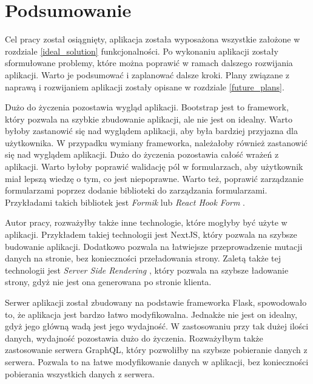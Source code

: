 \section{Podsumowanie}\label{summary}
Cel pracy został osiągnięty, aplikacja została wyposażona wszystkie założone w rozdziale \ref{ideal_solution} funkcjonalności. Po wykonaniu aplikacji zostały sformułowane problemy, które można poprawić w ramach dalszego rozwijania aplikacji. Warto je podsumować i zaplanować dalsze kroki. Plany związane z naprawą i rozwijaniem aplikacji zostały opisane w rozdziale \ref{future_plans}.

Dużo do życzenia pozostawia wygląd aplikacji. Bootstrap jest to framework, który pozwala na szybkie zbudowanie aplikacji, ale nie jest on idealny. Warto byłoby zastanowić się nad wyglądem aplikacji, aby była bardziej przyjazna dla użytkownika. W przypadku wymiany frameworka, należałoby również zastanowić się nad wyglądem aplikacji. Dużo do życzenia pozostawia całość wrażeń z aplikacji. Warto byłoby poprawić walidację pól w formularzach, aby użytkownik miał lepszą wiedzę o tym, co jest niepoprawne. Warto też, poprawić zarządzanie formularzami poprzez dodanie biblioteki do zarządzania formularzami. Przykładami takich bibliotek jest \textit{Formik} \cite{Formik} lub \textit{React Hook Form} \cite{React_hook_form}.

Autor pracy, rozważyłby także inne technologie, które mogłyby być użyte w aplikacji. Przykładem takiej technologii jest NextJS, który pozwala na szybsze budowanie aplikacji. Dodatkowo pozwala na łatwiejsze przeprowadzenie mutacji danych na stronie, bez konieczności przeładowania strony. Zaletą także tej technologii jest \textit{Server Side Rendering} \cite{SSR}, który pozwala na szybsze ładowanie strony, gdyż nie jest ona generowana po stronie klienta.

Serwer aplikacji został zbudowany na podstawie frameworka Flask, spowodowało to, że aplikacja jest bardzo łatwo modyfikowalna. Jednakże nie jest on idealny, gdyż jego główną wadą jest jego wydajność. W zastosowaniu przy tak dużej ilości danych, wydajność pozostawia dużo do życzenia. Rozważyłbym także zastosowanie serwera GraphQL, który pozwoliłby na szybsze pobieranie danych z serwera. Pozwala to na łatwe modyfikowanie danych w aplikacji, bez konieczności pobierania wszystkich danych z serwera.


